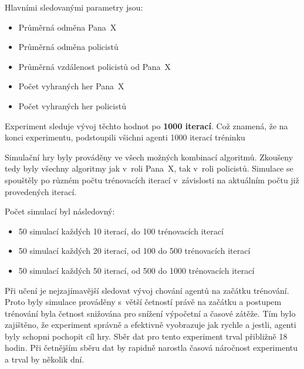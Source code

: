 \bigskip
\noindent Hlavními sledovanými parametry jsou:\vspace{-0.5em}
\begin{itemize}
  \item Průměrná odměna Pana~X\vspace{-0.5em}
  \item Průměrná odměna policistů\vspace{-0.5em}
  \item Průměrná vzdálenost policistů od Pana~X\vspace{-0.5em}
  \item Počet vyhraných her Pana~X\vspace{-0.5em}
  \item Počet vyhraných her policistů
\end{itemize}
Experiment sleduje vývoj těchto hodnot po \textbf{1000 iterací}.
Což znamená, že na konci experimentu, podstoupili všichni agenti 1000 iterací tréninku

Simulační hry byly prováděny ve všech možných kombinací algoritmů.
Zkoušeny tedy byly všechny algoritmy jak v~roli Pana~X, tak v~roli policistů.
Simulace se spouštěly po různém počtu trénovacích iterací v~závislosti na aktuálním počtu již provedených iterací.\pagebreak

Počet simulací byl následovný:\vspace{-0.5em}
\begin{itemize}
  \item 50 simulací každých 10 iterací, do 100 trénovacích iterací\vspace{-0.5em}
  \item 50 simulací každých 20 iterací, od 100 do 500 trénovacích iterací\vspace{-0.5em}
  \item 50 simulací každých 50 iterací, od 500 do 1000 trénovacích iterací\vspace{-0.5em}
\end{itemize}

Při učení je nejzajímavější sledovat vývoj chování agentů na začátku trénování.
Proto byly simulace prováděny s~větší četností právě na začátku a postupem trénování byla četnost snižována pro snížení výpočetní a časové zátěže.
Tím bylo zajištěno, že experiment správně a efektivně vyobrazuje jak rychle a jestli, agenti byly schopni pochopit cíl hry.
Sběr dat pro tento experiment trval přibližně 18 hodin.
Při četnějším sběru dat by rapidně narostla časová náročnost experimentu a trval by několik dní.


